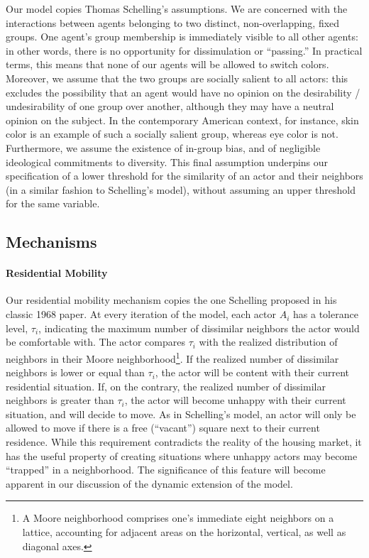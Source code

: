 \documentclass[a4paper,10pt]{article}
\begin{document}
Our model copies Thomas Schelling's assumptions. We are concerned with the interactions between agents belonging to two distinct, non-overlapping, fixed groups. One agent's group membership is immediately visible to all other agents: in other words, there is no opportunity for dissimulation or ``passing.'' In practical terms, this means that none of our agents will be allowed to switch colors. Moreover, we assume that the two groups are socially salient to all actors: this excludes the possibility that an agent would have no opinion on the desirability / undesirability of one group over another, although they may have a neutral opinion on the subject. In the contemporary American context, for instance, skin color is an example of such a socially salient group, whereas eye color is not. Furthermore, we assume the existence of in-group bias, and of negligible ideological commitments to diversity. This final assumption underpins our specification of a lower threshold for the similarity of an actor and their neighbors (in a similar fashion to Schelling's model), without assuming an upper threshold for the same variable. 

\subsection{Mechanisms}

\paragraph{Residential Mobility} Our residential mobility mechanism copies the one Schelling proposed in his classic 1968 paper. At every iteration of the model, each actor $A_i$ has a tolerance level, $\tau_i$, indicating the maximum number of dissimilar neighbors the actor would be comfortable with. The actor compares $\tau_i$ with the realized distribution of neighbors in their Moore neighborhood\footnote{A Moore neighborhood comprises one's immediate eight neighbors on a lattice, accounting for adjacent areas on the horizontal, vertical, as well as diagonal axes.}. If the realized number of dissimilar neighbors is lower or equal than $\tau_i$, the actor will be content with their current residential situation. If, on the contrary, the realized number of dissimilar neighbors is greater than $\tau_i$, the actor will become unhappy with their current situation, and will decide to move. As in Schelling's model, an actor will only be allowed to move if there is a free (``vacant'') square next to their current residence. While this requirement contradicts the reality of the housing market, it has the useful property of creating situations where unhappy actors may become ``trapped'' in a neighborhood. The significance of this feature will become apparent in our discussion of the dynamic extension of the model. 
\end{document}
